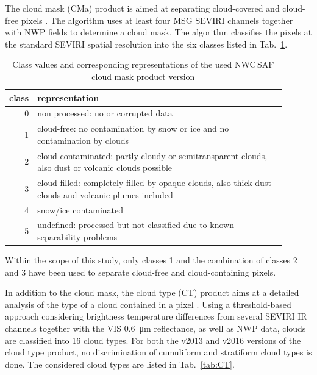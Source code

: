 The cloud mask (CMa) product is aimed at separating cloud-covered and cloud-free pixels \citep{NWCSAFWolken2014}. The algorithm uses at least four MSG SEVIRI channels together with NWP fields to determine a cloud mask. The algorithm classifies the pixels at the standard SEVIRI spatial resolution into the six classes listed in Tab.~\ref{tab:CMa}.

\begin{table}[htb]
    \centering
    \caption{Class values and corresponding representations of the used NWC\,SAF cloud mask product version}
    \begin{tabular}{rp{0.9\linewidth}}
         \toprule
         class & representation \\
         \midrule
         0 & non processed: no or corrupted data \\
         1 & cloud-free: no contamination by snow or ice and no contamination by clouds \\
         2 & cloud-contaminated: partly cloudy or semitransparent clouds, also dust or volcanic clouds possible \\
         3 & cloud-filled: completely filled by opaque clouds, also thick dust clouds and volcanic plumes included \\
         4 & snow/ice contaminated \\
         5 & undefined: processed but not classified due to known separability problems \\
         \bottomrule
    \end{tabular}
    
    \label{tab:CMa}
\end{table}

Within the scope of this study, only classes 1 and the combination of classes 2 and 3 have been used to separate cloud-free and cloud-containing pixels. 

In addition to the cloud mask, the cloud type (CT) product aims at a detailed analysis of the type of a cloud contained in a pixel \citep{NWCSAFWolken2014}. Using a threshold-based approach considering brightness temperature differences from several SEVIRI IR channels together with the VIS \SI{0.6}{\micro\metre} reflectance, as well as NWP data, clouds are classified into 16 cloud types. For both the v2013 and v2016 versions of the cloud type product, no discrimination of cumuliform and stratiform cloud types is done. The considered cloud types are listed in Tab.~\ref{tab:CT}.


